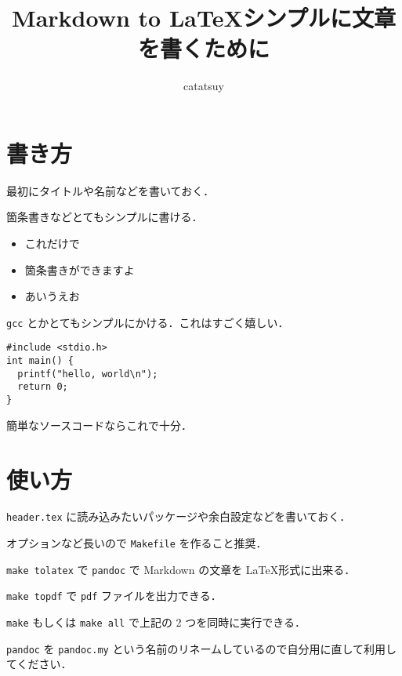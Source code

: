 \documentclass[12Q,papersize,]{jsarticle}
\title{Markdown to \LaTeX \linebreak シンプルに文章を書くために}
\author{catatsuy}
\date{}
\begin{document}
\maketitle

\section{書き方}

最初にタイトルや名前などを書いておく．

箇条書きなどとてもシンプルに書ける．

\begin{itemize}
\itemsep1pt\parskip0pt
\item
  これだけで
\item
  箇条書きができますよ
\item
  あいうえお
\end{itemize}

\verb`gcc` とかとてもシンプルにかける．これはすごく嬉しい．

\begin{verbatim}
#include <stdio.h>
int main() {
  printf("hello, world\n");
  return 0;
}
\end{verbatim}

簡単なソースコードならこれで十分．

\section{使い方}

\verb`header.tex` に読み込みたいパッケージや余白設定などを書いておく．

オプションなど長いので \verb`Makefile` を作ること推奨．

\verb`make tolatex` で \verb`pandoc` で Markdown の文章を
\LaTeX 形式に出来る．

\verb`make topdf` で \verb`pdf` ファイルを出力できる．

\verb`make` もしくは \verb`make all` で上記の 2 つを同時に実行できる．

\verb`pandoc` を \verb`pandoc.my`
という名前のリネームしているので自分用に直して利用してください．
\end{document}
